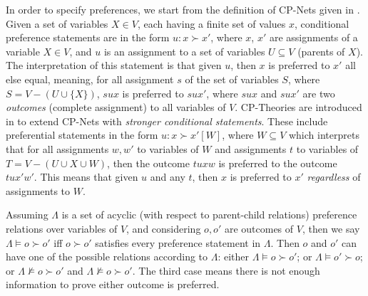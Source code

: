 In order to specify preferences, we start from the definition of CP-Nets given in \cite{Boutilier2004}. Given a set of variables $X \in V$, each having a finite set of values $x$, conditional preference statements are in the form $u : x \succ x'$, where $x$, $x'$ are assignments of a variable $X \in V$, and $u$ is an assignment to a set of variables $U \subseteq V$ (parents of $X$). The interpretation of this statement is that given $u$, then $x$ is preferred to $x'$ all else equal, meaning, for all assignment $s$ of the set of variables $S$, where $S = V - (U \cup \{X\})$, $sux$ is preferred to $sux'$, where $sux$ and $sux'$ are two \textit{outcomes} (complete assignment) to all variables of $V$. 
CP-Theories are introduced in \cite{Wilson2004} to extend CP-Nets with \textit{stronger conditional statements}. These include preferential statements in the form $u : x \succ x' [W]$, where $W \subseteq V$ which interprets that for all assignments $w,w'$ to variables of $W$ and assignments $t$ to variables of $T = V - (U \cup {X} \cup W)$, then the outcome $tuxw$ is preferred to the outcome $tux'w'$. This means that given $u$ and any $t$, then $x$ is preferred to $x'$ \textit{regardless} of assignments to $W$.



Assuming $\Lambda$ is a set of acyclic (with respect to parent-child relations) preference relations over variables of $V$, and considering $o,o'$ are outcomes of $V$, then we say $\Lambda \models o \succ o'$ iff $o \succ o'$ satisfies every preference statement in $\Lambda$. 
Then $o$ and $o'$ can have one of the possible relations according to $\Lambda$: either $\Lambda \models o \succ o'$; or $\Lambda \models o' \succ o$; or $\Lambda \not\models o \succ o'$ and $\Lambda \not\models o \succ o'$. The third case means there is not enough information to prove either outcome is preferred. 


